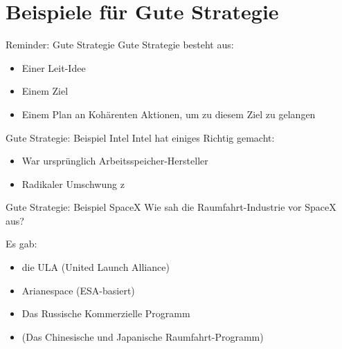 



\section{Beispiele für Gute Strategie}

\begin{frame}{Reminder: Gute Strategie}
    Gute Strategie besteht aus:
    \begin{itemize}
        \item Einer Leit-Idee
        \item Einem Ziel
        \item Einem Plan an Kohärenten Aktionen, um zu diesem Ziel zu gelangen
    \end{itemize}
\end{frame}

\begin{frame}[c]{Gute Strategie: Beispiel Intel}
    Intel hat einiges Richtig gemacht:
    \begin{itemize}
        \item War ursprünglich Arbeitsspeicher-Hersteller \pause
        \item Radikaler Umschwung z
    \end{itemize}
\end{frame}



\begin{frame}[c]{Gute Strategie: Beispiel SpaceX}
    Wie sah die Raumfahrt-Industrie vor SpaceX aus? \pause


    Es gab:
    \begin{itemize}
        \item die ULA (United Launch Alliance)
        \item Arianespace (ESA-basiert)
        \item Das Russische Kommerzielle Programm
        \item (Das Chinesische und Japanische Raumfahrt-Programm)
    \end{itemize}

\end{frame}



